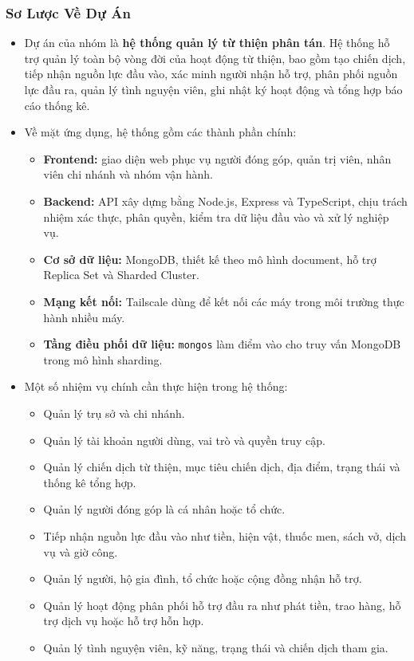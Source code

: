 \documentclass[12pt,a4paper]{article}
\begin{document}
\subsubsection{Sơ Lược Về Dự Án}
\begin{itemize}
\item Dự án của nhóm là \textbf{hệ thống quản lý từ thiện phân tán}. Hệ thống hỗ trợ quản lý toàn bộ vòng đời của hoạt động từ thiện, bao gồm tạo chiến dịch, tiếp nhận nguồn lực đầu vào, xác minh người nhận hỗ trợ, phân phối nguồn lực đầu ra, quản lý tình nguyện viên, ghi nhật ký hoạt động và tổng hợp báo cáo thống kê.
\item Về mặt ứng dụng, hệ thống gồm các thành phần chính:
\begin{itemize}
\item \textbf{Frontend:} giao diện web phục vụ người đóng góp, quản trị viên, nhân viên chi nhánh và nhóm vận hành.
\item \textbf{Backend:} API xây dựng bằng Node.js, Express và TypeScript, chịu trách nhiệm xác thực, phân quyền, kiểm tra dữ liệu đầu vào và xử lý nghiệp vụ.
\item \textbf{Cơ sở dữ liệu:} MongoDB, thiết kế theo mô hình document, hỗ trợ Replica Set và Sharded Cluster.
\item \textbf{Mạng kết nối:} Tailscale dùng để kết nối các máy trong môi trường thực hành nhiều máy.
\item \textbf{Tầng điều phối dữ liệu:} \texttt{mongos} làm điểm vào cho truy vấn MongoDB trong mô hình sharding.
\end{itemize}
\item Một số nhiệm vụ chính cần thực hiện trong hệ thống:
\begin{itemize}
\item Quản lý trụ sở và chi nhánh.
\item Quản lý tài khoản người dùng, vai trò và quyền truy cập.
\item Quản lý chiến dịch từ thiện, mục tiêu chiến dịch, địa điểm, trạng thái và thống kê tổng hợp.
\item Quản lý người đóng góp là cá nhân hoặc tổ chức.
\item Tiếp nhận nguồn lực đầu vào như tiền, hiện vật, thuốc men, sách vở, dịch vụ và giờ công.
\item Quản lý người, hộ gia đình, tổ chức hoặc cộng đồng nhận hỗ trợ.
\item Quản lý hoạt động phân phối hỗ trợ đầu ra như phát tiền, trao hàng, hỗ trợ dịch vụ hoặc hỗ trợ hỗn hợp.
\item Quản lý tình nguyện viên, kỹ năng, trạng thái và chiến dịch tham gia.

\end{itemize}
\end{itemize}
\end{document}
